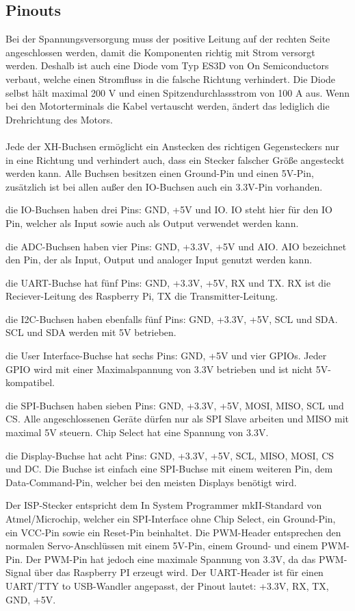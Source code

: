 \documentclass[12pt]{article}
\begin{document}
\subsection{Pinouts}
Bei der Spannungsversorgung muss der positive Leitung auf der rechten Seite angeschlossen werden, damit die Komponenten richtig mit Strom versorgt werden. Deshalb ist auch eine Diode vom Typ ES3D von On Semiconductors verbaut, welche einen Stromfluss in die falsche Richtung verhindert. Die Diode selbst hält maximal 200 V und einen Spitzendurchlassstrom von 100 A aus. Wenn bei den Motorterminals die Kabel vertauscht werden, ändert das lediglich die Drehrichtung des Motors.\\\\
Jede der XH-Buchsen ermöglicht ein Anstecken des richtigen Gegensteckers nur in eine Richtung und verhindert auch, dass ein Stecker falscher Größe angesteckt werden kann. Alle Buchsen besitzen einen Ground-Pin und einen 5V-Pin, zusätzlich ist bei allen außer den IO-Buchsen auch ein 3.3V-Pin vorhanden. 
\begin{compactitem}
    \item die IO-Buchsen haben drei Pins: GND, +5V und IO. IO steht hier für den IO Pin, welcher als Input sowie auch als Output verwendet werden kann.
    \item die ADC-Buchsen haben vier Pins: GND, +3.3V, +5V und AIO. AIO bezeichnet den Pin, der als Input, Output und analoger Input genutzt werden kann.
    \item die UART-Buchse hat fünf Pins: GND, +3.3V, +5V, RX und TX. RX ist die Reciever-Leitung des Raspberry Pi, TX die Transmitter-Leitung.
    \item die I2C-Buchsen haben ebenfalls fünf Pins: GND, +3.3V, +5V, SCL und SDA. SCL und SDA werden mit 5V betrieben.
    \item die User Interface-Buchse hat sechs Pins: GND, +5V und vier GPIOs. Jeder GPIO wird mit einer Maximalspannung von 3.3V betrieben und ist nicht 5V-kompatibel.
    \item die SPI-Buchsen haben sieben Pins: GND, +3.3V, +5V, MOSI, MISO, SCL und CS. Alle angeschlossenen Geräte dürfen nur als SPI Slave arbeiten und MISO mit maximal 5V steuern. Chip Select hat eine Spannung von 3.3V.
    \item die Display-Buchse hat acht Pins: GND, +3.3V, +5V, SCL, MISO, MOSI, CS und DC. Die Buchse ist einfach eine SPI-Buchse mit einem weiteren Pin, dem Data-Command-Pin, welcher bei den meisten Displays benötigt wird.
\end{compactitem}
Der ISP-Stecker entspricht dem In System Programmer mkII-Standard von Atmel/Microchip, welcher ein SPI-Interface ohne Chip Select, ein Ground-Pin, ein VCC-Pin sowie ein Reset-Pin beinhaltet. Die PWM-Header entsprechen den normalen Servo-Anschlüssen mit einem 5V-Pin, einem Ground- und einem PWM-Pin. Der PWM-Pin hat jedoch eine maximale Spannung von 3.3V, da das PWM-Signal über das Raspberry PI erzeugt wird. Der UART-Header ist für einen UART/TTY to USB-Wandler angepasst, der Pinout lautet: +3.3V, RX, TX, GND, +5V.
\end{document}
